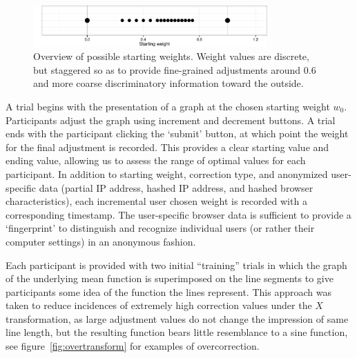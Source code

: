 \documentclass[11pt]{isuthesis}\usepackage[]{graphicx}\usepackage[]{color}
\begin{document}
\begin{figure}\centering
\includegraphics[keepaspectratio=TRUE,width=0.8\textwidth]{fig-study-weight-dist}
\caption[Overview of possible starting weights]{Overview of possible starting weights. Weight values are discrete, but staggered so as to provide fine-grained adjustments around 0.6 and more coarse discriminatory information toward the outside.}\label{fig:weightdist}
\end{figure}

A trial begins with the presentation of a graph at the chosen starting weight $w_0$. Participants adjust the graph using increment and decrement buttons. A trial ends with the participant clicking the `submit' button, at which point the weight for the final adjustment is recorded. This provides a clear starting value and ending value, allowing us to assess the range of optimal values for each participant. In addition to starting weight, correction type, and anonymized user-specific data (partial IP address, hashed IP address, and hashed browser characteristics), each incremental user chosen weight is recorded with a corresponding timestamp. The user-specific browser data is sufficient to provide a `fingerprint' to distinguish and recognize individual users (or rather their computer settings) in an anonymous fashion. 

Each participant is provided with two initial ``training'' trials in which the  graph of the underlying mean function is superimposed on the line segments to give participants some idea of the  function the lines represent. This approach was taken to reduce  incidences of extremely high  correction values under the $X$ transformation, as large adjustment values do not change the impression of same line length, but the resulting function bears little resemblance to a sine function, see figure~\ref{fig:overtransform} for examples of overcorrection.
\end{document}
